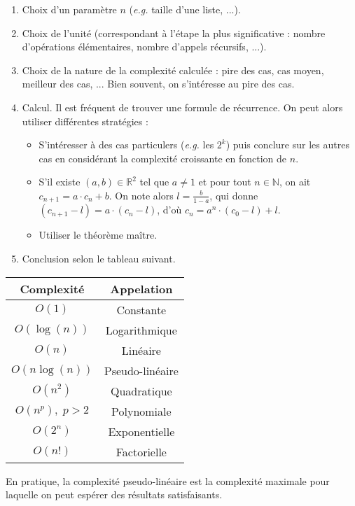 \documentclass{hibiscus}
\begin{document}
\medskip \begin{enumerate}
\item Choix d'un paramètre $n$ (\textit{e.g.} taille d'une liste, ...).
\item Choix de l'unité (correspondant à l'étape la plus significative : nombre d'opérations élémentaires, nombre d'appels récursifs, ...).
\item Choix de la nature de la complexité calculée : pire des cas, cas moyen, meilleur des cas, ... Bien souvent, on s'intéresse au pire des cas.
\item Calcul. Il est fréquent de trouver une formule de récurrence. On peut alors utiliser différentes stratégies :
    \begin{itemize}
    \item S'intéresser à des cas particulers (\textit{e.g.} les $2^k$) puis conclure sur les autres cas en considérant la complexité croissante en fonction de $n$.
    \item S'il existe $(a, b) \in \mathbb{R}^2$ tel que $a \neq 1$ et pour tout $n \in \mathbb{N}$, on ait $c_{n+1} = a \cdot c_n + b$. On note alors $l = \frac{b}{1 - a}$, qui donne $(c_{n+1} - l) = a \cdot (c_n - l)$, d'où $c_n = a^n \cdot (c_0 - l) + l$.
    \item Utiliser le théorème maître.
    \end{itemize}
\item Conclusion selon le tableau suivant.
\end{enumerate}

\begin{center}
\begin{tabular}{|c|c|} \hline
Complexité & Appelation \\ \hline
$O(1)$ & Constante \\ \hline
$O(\log(n))$ & Logarithmique \\ \hline
$O(n)$ & Linéaire \\ \hline
$O(n \log(n))$ & Pseudo-linéaire \\ \hline
$O(n^2)$ & Quadratique \\ \hline
$O(n^p), \; p > 2$ & Polynomiale \\ \hline
$O(2^n)$ & Exponentielle \\ \hline
$O(n!)$ & Factorielle \\ \hline
\end{tabular}
\end{center}

\medskip \par En pratique, la complexité pseudo-linéaire est la complexité maximale pour laquelle on peut espérer des résultats satisfaisants.
\end{document}
